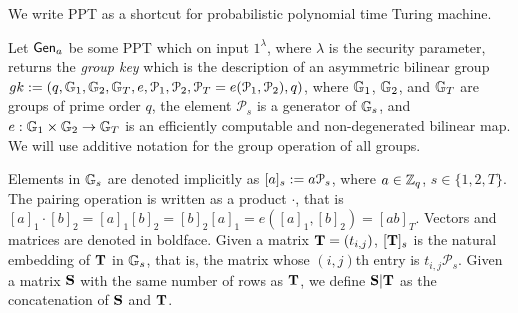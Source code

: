 
We write PPT as a shortcut for probabilistic polynomial time Turing machine.

Let $\mathsf{Gen}_a$ be some PPT which on input $1^{\lambda}$, where $\lambda$ is the security parameter, returns the \emph{group key} which is the description of an asymmetric bilinear group $gk:=(q,\mathbb{G}_1,\mathbb{G}_2,\mathbb{G}_T,e,\mathcal{P}_1,\mathcal{P}_2,\mathcal{P}_T=e(\mathcal{P}_1,\mathcal{P}_2),q)$, where $\mathbb{G}_1$, $\mathbb{G}_2$,
and $\mathbb{G}_T$ are groups of prime order $q$, the element $\mathcal{P}_s$ is a generator of 
$\mathbb{G}_s$, and $e:\mathbb{G}_1\times\mathbb{G}_2\to\mathbb{G}_T$ is an efficiently computable and non-degenerated bilinear map. We will use additive notation for the group operation of all groups.

Elements in $\mathbb{G}_s$ are denoted implicitly as $[a]_s:=a \mathcal{P}_s$, where $a\in\mathbb{Z}_q$, $s\in\{1,2,T\}$. 
The pairing operation is written as a product $\cdot$, that is $[a]_1 \cdot [b]_2 = [a]_1 [b]_2= [b]_2[a]_1=e([a]_1,[b]_2)=[ab]_T$. Vectors and matrices are denoted in boldface. Given a matrix $\mathbf{{T}}=(t_{i,j})$, $[\mathbf{{T}}]_s$ is
the natural embedding of $\mathbf{{T}}$ in $\mathbb{G}_s$, that is, the matrix whose $(i,j)$th entry is $t_{i,j}\mathcal{P}_s$. Given a matrix $\mathbf{{S}}$ with the same number of rows as $\mathbf{{T}}$, we define $\mathbf{{S}}|\mathbf{{T}}$ as the concatenation of $\mathbf{{S}}$ and $\mathbf{{T}}$.

